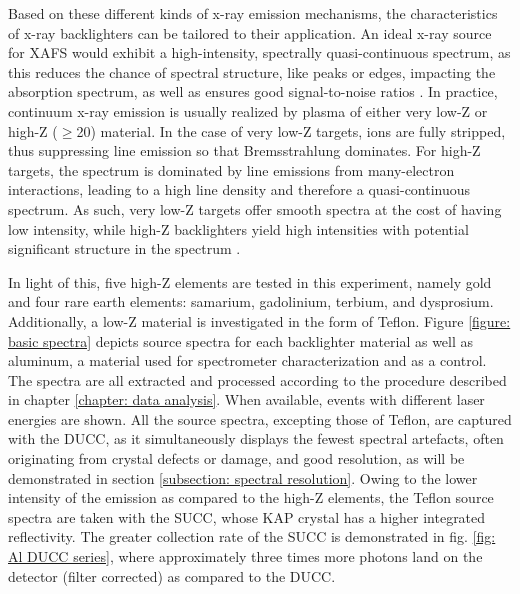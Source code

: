 Based on these different kinds of x-ray emission mechanisms, the characteristics of x-ray backlighters can be tailored to their application. An ideal x-ray source for XAFS would exhibit a high-intensity, spectrally quasi-continuous spectrum, as this reduces the chance of spectral structure, like peaks or edges, impacting the absorption spectrum, as well as ensures good signal-to-noise ratios \citep{riley2021warm, eason1984improved}. In practice, continuum x-ray emission is usually realized by plasma of either very low-Z or high-Z ($\geq$20) material. In the case of very low-Z targets, ions are fully stripped, thus suppressing line emission so that Bremsstrahlung dominates. For high-Z targets, the spectrum is dominated by line emissions from many-electron interactions, leading to a high line density and therefore a quasi-continuous spectrum. As such, very low-Z targets offer smooth spectra at the cost of having low intensity, while high-Z backlighters yield high intensities with potential significant structure in the spectrum \citep{giulietti1998x}.

In light of this, five high-Z elements are tested in this experiment, namely gold and four rare earth elements: samarium, 
gadolinium, terbium, and dysprosium. Additionally, a low-Z material is investigated in the form of Teflon. Figure \ref{figure: basic spectra} depicts source spectra for each backlighter material as well as aluminum, a material used for spectrometer characterization and as a control. The spectra are all extracted and processed according to the procedure described in chapter \ref{chapter: data analysis}. When available, events with different laser energies are shown. All the source spectra, excepting those of Teflon, are captured with the DUCC, as it simultaneously displays the fewest spectral artefacts, often originating from crystal defects or damage, and good resolution, as will be demonstrated in section \ref{subsection: spectral resolution}. Owing to the lower intensity of the emission as compared to the high-Z elements, the Teflon source spectra are taken with the SUCC, whose KAP crystal has a higher integrated reflectivity. The greater collection rate of the SUCC is demonstrated in fig. \ref{fig: Al DUCC series}, where approximately three times more photons land on the detector (filter corrected) as compared to the DUCC. 

